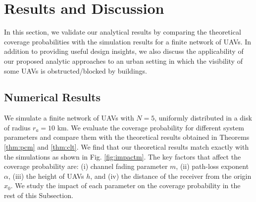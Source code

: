 \documentclass[journal,draftclsnofoot,onecolumn,12pt]{IEEEtran}
\begin{document}
\section{Results and Discussion}
In this section, we validate our analytical results by comparing the theoretical coverage probabilities with the simulation results for a finite network of UAVs. In addition to providing useful design insights, we also discuss the applicability of our proposed analytic approaches to an urban setting in which the visibility of some UAVs is obstructed/blocked by buildings.

\subsection{Numerical Results}
We simulate a finite network of UAVs with $N=5$, uniformly distributed in a disk of radius $r_a = 10$ km. We evaluate the coverage probability for different system parameters and compare them with the theoretical results obtained in Theorems \ref{thm:pcm} and \ref{thm:clt}. We find that our theoretical results match exactly with the simulations as shown in Fig. \ref{fig:impactm}. The key factors that affect the coverage probability are: (i) channel fading parameter $m$, (ii) path-loss exponent $\alpha$, (iii) the height of UAVs $h$,  and (iv) the distance of the receiver from the origin $x_0$. We study the impact of each parameter on the coverage probability in the rest of this Subsection.
\end{document}
